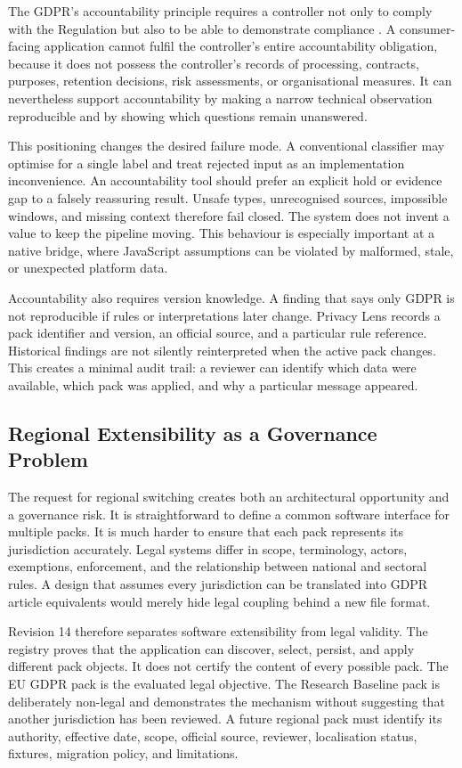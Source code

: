 The GDPR's accountability principle requires a controller not only to comply with the Regulation but also to be able to demonstrate compliance \cite{eurlex2016}. A consumer-facing application cannot fulfil the controller's entire accountability obligation, because it does not possess the controller's records of processing, contracts, purposes, retention decisions, risk assessments, or organisational measures. It can nevertheless support accountability by making a narrow technical observation reproducible and by showing which questions remain unanswered.

This positioning changes the desired failure mode. A conventional classifier may optimise for a single label and treat rejected input as an implementation inconvenience. An accountability tool should prefer an explicit hold or evidence gap to a falsely reassuring result. Unsafe types, unrecognised sources, impossible windows, and missing context therefore fail closed. The system does not invent a value to keep the pipeline moving. This behaviour is especially important at a native bridge, where JavaScript assumptions can be violated by malformed, stale, or unexpected platform data.

Accountability also requires version knowledge. A finding that says only GDPR is not reproducible if rules or interpretations later change. Privacy Lens records a pack identifier and version, an official source, and a particular rule reference. Historical findings are not silently reinterpreted when the active pack changes. This creates a minimal audit trail: a reviewer can identify which data were available, which pack was applied, and why a particular message appeared.

\subsection{Regional Extensibility as a Governance Problem}

The request for regional switching creates both an architectural opportunity and a governance risk. It is straightforward to define a common software interface for multiple packs. It is much harder to ensure that each pack represents its jurisdiction accurately. Legal systems differ in scope, terminology, actors, exemptions, enforcement, and the relationship between national and sectoral rules. A design that assumes every jurisdiction can be translated into GDPR article equivalents would merely hide legal coupling behind a new file format.

Revision 14 therefore separates software extensibility from legal validity. The registry proves that the application can discover, select, persist, and apply different pack objects. It does not certify the content of every possible pack. The EU GDPR pack is the evaluated legal objective. The Research Baseline pack is deliberately non-legal and demonstrates the mechanism without suggesting that another jurisdiction has been reviewed. A future regional pack must identify its authority, effective date, scope, official source, reviewer, localisation status, fixtures, migration policy, and limitations.

